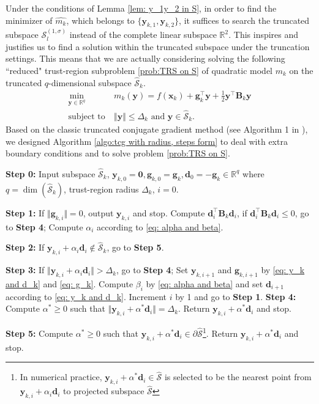 \documentclass[colorlinks=true, linkcolor=blue, citecolor=blue, urlcolor=blue]{article}
\theoremstyle{plain}
\theoremstyle{definition}
\theoremstyle{remark}
\begin{document}
Under the conditions of Lemma \ref{lem: y_1y_2 in S}, in order to find the minimizer of $\hat{m_k}$, which belongs to $\{\bm y_{k,1},\bm y_{k,2}\}$, it suffices to search the truncated subspace $\mathcal{S}_l^{(1,\sigma)}$ instead of the complete linear subspace $\mathbb{R}^2$. This inspires and justifies us to find a solution within the truncated subspace under the truncation settings. This means that we are actually considering solving the following ``reduced" trust-region subproblem \eqref{prob:TRS on S} of quadratic model $m_k$ on the truncated $q$-dimensional subspace $\hat{\mathcal{S}}_k$.
\begin{equation}\label{prob:TRS on S}
\begin{aligned}
    \min_{\bm y\in\mathbb{R}^q}\ &m_k(\bm y)=f(\bm x_k)+\bm{g}_k^\top\bm{y}+\frac{1}{2}\bm{y}^\top \bm{B}_k\bm{y}\\
    \text{subject to}\ & \Vert \bm y\Vert\leq \Delta_k\text{ and }\bm y\in\hat{\mathcal{S}}_k. 
\end{aligned}    
\end{equation}
Based on the classic truncated conjugate gradient method (see Algorithm 1 in \citet{2000On}), we designed Algorithm \ref{algo:tcg with radius, steps form} to deal with extra boundary conditions and to solve problem \eqref{prob:TRS on S}.
\begin{algorithm}
\caption{STCG}
\begin{algorithmic}[1]
    \State \textbf{Step 0:} Input subspace $\hat{\mathcal{S}}_k$, $\bm y_{k,0}=\bm{0}, \bm g_{k,0}=\bm{g}_k, \bm d_0=-\bm{g}_k\in\mathbb{R}^q$ where $q=\dim(\hat{\mathcal{S}}_k)$, trust-region radius $\Delta_k$, $i=0$.

    \State \textbf{Step 1:} If $\Vert \bm g_{k,i}\Vert=0$, output $\bm y_{k,i}$ and stop. Compute $\bm{d}_i^\top\bm{B}_k\bm{d}_i$, if $\bm{d}_i^\top\bm{B}_k\bm{d}_i\leq 0$, go to \textbf{Step 4}; Compute $\alpha_i$ according to \ref{eq: alpha and beta}.

    \State \textbf{Step 2:} If $\bm y_{k,i}+\alpha_i\bm d_i\notin\hat{\mathcal{S}}_k$, go to \textbf{Step 5}.

    \State \textbf{Step 3:} If $\Vert \bm y_{k,i}+\alpha_i\bm d_i\Vert>\Delta_k$, go to \textbf{Step 4}; Set $\bm y_{k,i+1}$ and $\bm g_{k,i+1}$ by \ref{eq: y_k and d_k} and \ref{eq: g_k}. Compute $\beta_i$ by \ref{eq: alpha and beta} and set $\bm d_{i+1}$ according to \eqref{eq: y_k and d_k}.
    Increment $i$ by 1 and go to \textbf{Step 1}.
    \State \textbf{Step 4:} Compute $\alpha^*\geq 0$ such that $\Vert \bm{y}_{k,i}+\alpha^*\bm{d}_i\Vert=\Delta_k$. Return $\bm{y}_{k,i}+\alpha^*\bm{d}_i$ and stop.

    \State \textbf{Step 5:} Compute $\alpha^*\geq 0$ such that $\bm{y}_{k,i}+\alpha^*\bm{d}_i\in\partial \hat{\mathcal{S}}$\footnote{In numerical practice, $\bm{y}_{k,i}+\alpha^*\bm{d}_i\in\hat{\mathcal{S}}$ is selected to be the nearest point from $\bm{y}_{k,i}+\alpha_i\bm{d}_i$ to projected subspace $\hat{\mathcal{S}}$}. Return $\bm{y}_{k,i}+\alpha^*\bm{d}_i$ and stop.
\end{algorithmic}
\label{algo:tcg with radius, steps form}
\end{algorithm}
\end{document}
